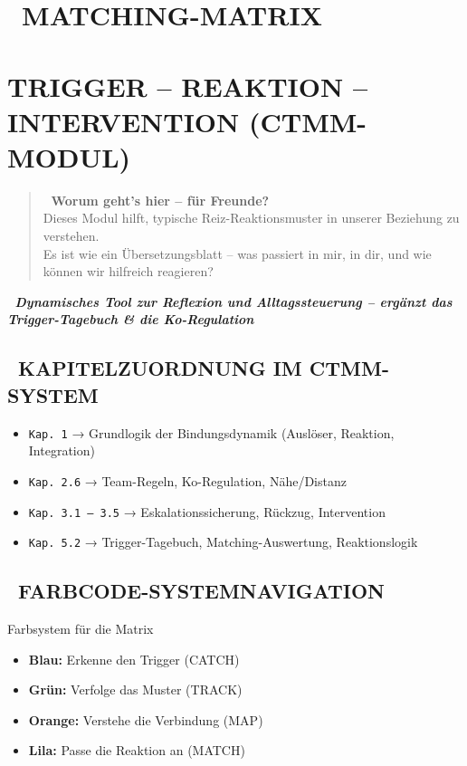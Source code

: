 \newpage
\section*{\textcolor{ctmmPurple}{\faPuzzlePiece~MATCHING-MATRIX}}
\label{sec:matching-matrix}

\section*{\textcolor{ctmmOrange}{\textbf{TRIGGER -- REAKTION -- INTERVENTION (CTMM-MODUL)}}}
\label{sec:trigger-reaktion-intervention}

\begin{quote}
🧠 \textbf{Worum geht's hier -- für Freunde?}\\
Dieses Modul hilft, typische Reiz-Reaktionsmuster in unserer Beziehung zu verstehen.\\
Es ist wie ein Übersetzungsblatt -- was passiert in mir, in dir, und wie können wir hilfreich reagieren?
\end{quote}

🧩 \emph{\textbf{Dynamisches Tool zur Reflexion und Alltagssteuerung -- ergänzt das Trigger-Tagebuch \& die Ko-Regulation}}

\subsection*{\textcolor{ctmmBlue}{\faBook~KAPITELZUORDNUNG IM CTMM-SYSTEM}}

\begin{itemize}
\item \texttt{Kap. 1} → Grundlogik der Bindungsdynamik (Auslöser, Reaktion, Integration)
\item \texttt{Kap. 2.6} → Team-Regeln, Ko-Regulation, Nähe/Distanz
\item \texttt{Kap. 3.1 -- 3.5} → Eskalationssicherung, Rückzug, Intervention
\item \texttt{Kap. 5.2} → Trigger-Tagebuch, Matching-Auswertung, Reaktionslogik
\end{itemize}

\subsection*{\textcolor{ctmmGreen}{\faPalette~FARBCODE-SYSTEMNAVIGATION}}

\begin{ctmmBlueBox}{Farbsystem für die Matrix}
\begin{itemize}
\item \textcolor{ctmmBlue}{\textbf{Blau:}} Erkenne den Trigger (CATCH)
\item \textcolor{ctmmGreen}{\textbf{Grün:}} Verfolge das Muster (TRACK)
\item \textcolor{ctmmOrange}{\textbf{Orange:}} Verstehe die Verbindung (MAP)
\item \textcolor{ctmmPurple}{\textbf{Lila:}} Passe die Reaktion an (MATCH)
\end{itemize}
\end{ctmmBlueBox}

